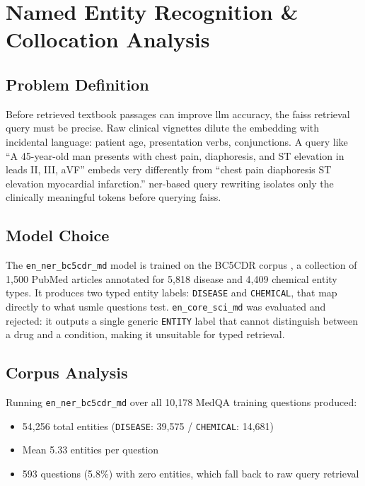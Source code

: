 \chapter{Named Entity Recognition \& Collocation Analysis}
\label{ch:ner_collocation}

\section{Problem Definition}
Before retrieved textbook passages can improve \gls{llm} accuracy, the \gls{faiss} retrieval query must be precise. Raw clinical vignettes dilute the embedding with incidental language: patient age, presentation verbs, conjunctions. A query like ``A 45-year-old man presents with chest pain, diaphoresis, and ST elevation in leads II, III, aVF'' embeds very differently from ``chest pain diaphoresis ST elevation myocardial infarction.'' \gls{ner}-based query rewriting isolates only the clinically meaningful tokens before querying \gls{faiss}.

\section{Model Choice}

The \texttt{en\_ner\_bc5cdr\_md} model \cite{neumann_scispacy_2019} is trained on the BC5CDR corpus \cite{li_biocreative_2016}, a collection of 1,500 PubMed articles annotated for 5,818 disease and 4,409 chemical entity types. It produces two typed entity labels: \texttt{DISEASE} and \texttt{CHEMICAL}, that map directly to what \gls{usmle} questions test. \texttt{en\_core\_sci\_md} was evaluated and rejected: it outputs a single generic \texttt{ENTITY} label that cannot distinguish between a drug and a condition, making it unsuitable for typed retrieval.

\section{Corpus Analysis}
Running \texttt{en\_ner\_bc5cdr\_md} over all 10,178 MedQA training questions produced:
\begin{itemize}
    \item 54,256 total entities (\texttt{DISEASE}: 39,575 / \texttt{CHEMICAL}: 14,681)
    \item Mean 5.33 entities per question
    \item 593 questions (5.8\%) with zero entities, which fall back to raw query retrieval
\end{itemize}

